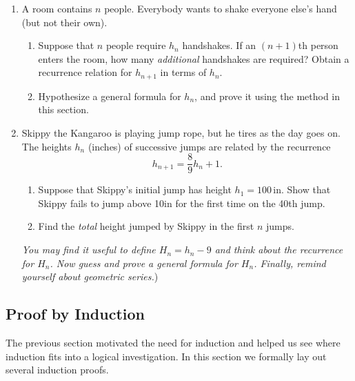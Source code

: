\begin{exercises}{}{}

\begin{enumerate}
    \item A room contains $n$ people. Everybody wants to shake everyone else's hand (but not their own).
    \begin{enumerate}
      \item Suppose that $n$ people require $h_n$ handshakes. If an $(n+1)$th person enters the room, how many \emph{additional} handshakes are required? Obtain a recurrence relation for $h_{n+1}$ in terms of $h_n$.
      \item Hypothesize a general formula for $h_n$, and prove it using the method in this section.
    \end{enumerate}
  
  \item Skippy the Kangaroo is playing jump rope, but he tires as the day goes on. The heights $h_n$ (inches) of successive jumps are related by the recurrence 
  \[h_{n+1}=\frac 8{9} h_n+1.\]
  \begin{enumerate}
  	\item Suppose that Skippy's initial jump has height $h_1=100\,$in. Show that Skippy fails to jump above 10in for the first time on the 40th jump.
  	\item Find the \emph{total} height jumped by Skippy in the first $n$ jumps.
  \end{enumerate}
  \emph{You may find it useful to define $H_n=h_n-9$ and think about the recurrence for $H_n$. Now guess and prove a general formula for $H_n$. Finally, remind yourself about geometric series.})
\end{enumerate}

\end{exercises}

\clearpage



\subsection{Proof by Induction}

The previous section motivated the need for induction and helped us see where induction fits into a logical investigation. In this section we formally lay out several induction proofs.\par

